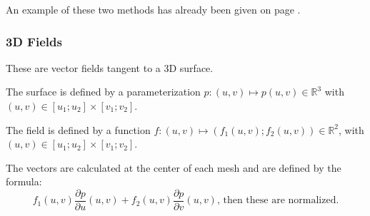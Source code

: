 An example of these two methods has already been given on page \pageref{fields}.

\subsubsection{3D Fields}

These are vector fields tangent to a 3D surface.

The surface is defined by a parameterization $p\colon(u,v) \mapsto p(u,v) \in \mathbb R^3$ with $(u,v) \in [u_1;u_2]\times[v_1;v_2]$.

The field is defined by a function $f\colon(u,v) \mapsto (f_1(u,v);f_2(u,v)) \in \mathbb R^2$, with $(u,v) \in [u_1;u_2]\times[v_1;v_2]$.

The vectors are calculated at the center of each mesh and are defined by the formula:
\[ f_1(u,v) \dfrac{\partial p}{\partial u}(u,v)+f_2(u,v)\dfrac{\partial p}{\partial v}(u,v)\text{, then these are normalized.}\]

